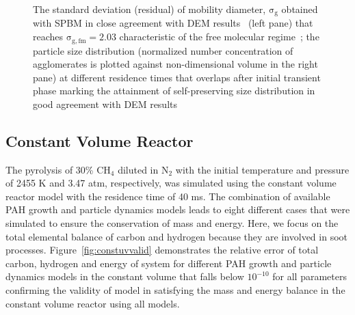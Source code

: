 \begin{figure}[H]
\begin{subfigure}[t]{0.4\textwidth}
	\end{subfigure}
	\caption{The standard deviation (residual) of mobility diameter, $\mathrm{\sigma_g}$ obtained with SPBM in close agreement with DEM results~\citep{kholghy2021surface} (left pane) that reaches $\mathrm{\sigma_{g,fm}=2.03}$ characteristic of the free molecular regime~\citep{vemury1995self}; the particle size distribution (normalized number concentration of agglomerates is plotted against non-dimensional volume in the right pane) at different residence times that overlaps after initial transient phase marking the attainment of self-preserving size distribution in good agreement with DEM results~\citep{goudeli2015coagulation}}
	\label{fig:coagvalid_sigmapsd} 
\end{figure}



\subsection{Constant Volume Reactor}
The pyrolysis of 30\% $\mathrm{CH_4}$ diluted in $\mathrm{N_2}$ with the initial temperature and pressure of 2455 K and 3.47 atm, respectively, was simulated using the constant volume reactor model with the residence time of 40 ms. The combination of available PAH growth and particle dynamics models leads to eight different cases that were simulated to ensure the conservation of mass and energy. Here, we focus on the total elemental balance of carbon and hydrogen because they are involved in soot processes. %
Figure~\ref{fig:constuvvalid} demonstrates the relative error of total carbon, hydrogen and energy of system for different PAH growth and particle dynamics models in the constant volume that falls below $\mathrm{10^{-10}}$ for all parameters confirming the validity of model in satisfying the mass and energy balance in the constant volume reactor using all models. 

